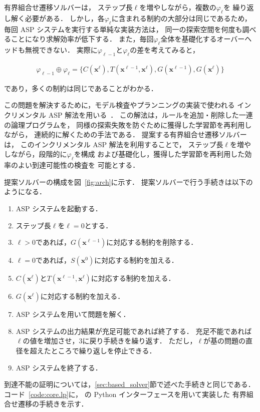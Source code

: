 有界組合せ遷移ソルバーは，
ステップ長$\ell$を増やしながら，複数の$\varphi_\ell$を
繰り返し解く必要がある．
しかし，各$\varphi_\ell$に含まれる制約の大部分は同じであるため，
毎回 ASP システムを実行する単純な実装方法は，
同一の探索空間を何度も調べることになり求解効率が低下する．
また，毎回$\varphi_\ell$全体を基礎化するオーバーヘッドも無視できない．
実際に$\varphi_{\ell -1}$と$\varphi_{\ell}$の差を考えてみると，
\begin{adjustvboxheight}
\begin{align*}
  \varphi_{\ell -1} \oplus \varphi_{\ell} = 
    \{C(\bm{x}^{\ell}), T(\bm{x}^{\ell -1}, 
    \bm{x}^{\ell}), G(\bm{x}^{\ell -1}), G(\bm{x}^{\ell})\}
\end{align*}
\end{adjustvboxheight}
であり，多くの制約は同じであることがわかる．

この問題を解決するために，モデル検査やプランニングの実装で使われる
インクリメンタル ASP 解法を用いる~\cite{GebserKKS19}．
この解法は，ルールを追加・削除した一連の論理プログラムを，
同様の探索失敗を防ぐために獲得した学習節を再利用しながら，
連続的に解くための手法である．
提案する有界組合せ遷移ソルバーは，
このインクリメンタル ASP 解法を利用することで，
ステップ長$\ell$を増やしながら，段階的に$\varphi_\ell$を構成
および基礎化し，獲得した学習節を再利用した効率のよい到達可能性の検査を
可能とする．

提案ソルバーの構成を図~\ref{fig:arch}に示す．
提案ソルバーで行う手続きは以下のようになる．
\begin{enumerate}
  \item ASP システムを起動する．
  \item ステップ長$\ell$を$\ell=0$とする．
  \item $\ell > 0$であれば，$G(\bm{x}^{\ell -1})$に対応する制約を削除する．
  \item $\ell=0$であれば，$S(\bm{x}^0)$に対応する制約を加える．
  \item $C(\bm{x}^{\ell})$と$T(\bm{x}^{\ell -1}, \bm{x}^{\ell})$に対応する制約を加える．
  \item $G(\bm{x}^{\ell})$に対応する制約を加える．
  \item ASP システムを用いて問題を解く．
  \item ASP システムの出力結果が充足可能であれば終了する．
        充足不能であれば$\ell$の値を増加させ，3に戻り手続きを繰り返す．
        ただし，$\ell$が基の問題の直径を超えたところで繰り返しを停止できる．
  \item ASP システムを終了する．
\end{enumerate}
到達不能の証明については，\ref{sec:based_solver}節で述べた手続きと同じである．
コード~\ref{code:core.lp}に，
{\clingo}の Python インターフェースを用いて実装した
有界組合せ遷移の手続きを示す．

